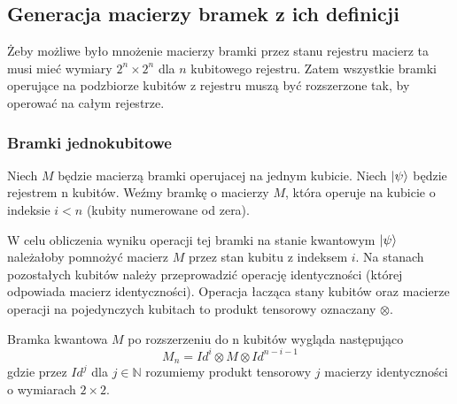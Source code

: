 \subsection{Generacja macierzy bramek z ich definicji}
Żeby możliwe było mnożenie macierzy bramki przez stanu rejestru macierz ta musi mieć wymiary $2^n \times 2^n$ dla $n$ kubitowego rejestru. Zatem wszystkie bramki operujące na podzbiorze kubitów z rejestru muszą być rozszerzone tak, by operować na całym rejestrze.
\subsubsection{Bramki jednokubitowe}
\label{oneqgate}
Niech $M$ będzie macierzą bramki operujacej na jednym kubicie. Niech $\ket{\psi}$ będzie rejestrem n kubitów.
Weźmy bramkę o macierzy $M$, która operuje na kubicie o indeksie $i < n$ (kubity numerowane od zera).
\par W celu obliczenia wyniku operacji tej bramki na stanie kwantowym $\ket{\psi}$ należałoby pomnożyć macierz $M$ przez stan kubitu z indeksem $i$. Na stanach pozostałych kubitów należy przeprowadzić operację identyczności (której odpowiada macierz identyczności). Operacja łacząca stany kubitów oraz macierze operacji na pojedynczych kubitach to produkt tensorowy oznaczany $\otimes$.
\par Bramka kwantowa $M$ po rozszerzeniu do n kubitów wygląda następująco
\[M_n = Id^i \otimes M \otimes Id^{n-i-1}\]
gdzie przez $Id^j$ dla $j \in \mathbb{N}$ rozumiemy produkt tensorowy $j$ macierzy identyczności o wymiarach $2 \times 2$.
